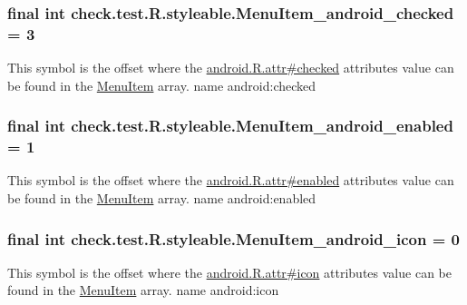 \subsubsection[{Menu\+Item\+\_\+android\+\_\+checked}]{\setlength{\rightskip}{0pt plus 5cm}final int check.\+test.\+R.\+styleable.\+Menu\+Item\+\_\+android\+\_\+checked = 3\hspace{0.3cm}{\ttfamily [static]}}\label{classcheck_1_1test_1_1_r_1_1styleable_a70f7214872e00bf3172089cd9d463d88}
This symbol is the offset where the \hyperlink{}{android.\+R.\+attr\#checked} attribute\textquotesingle{}s value can be found in the \hyperlink{classcheck_1_1test_1_1_r_1_1styleable_af26376072eab01d1b4197e48992dc936}{Menu\+Item} array.  name android\+:checked \hypertarget{classcheck_1_1test_1_1_r_1_1styleable_a51ca1e5adfffb26576e59bc1610f9c6e}{}
\subsubsection[{Menu\+Item\+\_\+android\+\_\+enabled}]{\setlength{\rightskip}{0pt plus 5cm}final int check.\+test.\+R.\+styleable.\+Menu\+Item\+\_\+android\+\_\+enabled = 1\hspace{0.3cm}{\ttfamily [static]}}\label{classcheck_1_1test_1_1_r_1_1styleable_a51ca1e5adfffb26576e59bc1610f9c6e}
This symbol is the offset where the \hyperlink{}{android.\+R.\+attr\#enabled} attribute\textquotesingle{}s value can be found in the \hyperlink{classcheck_1_1test_1_1_r_1_1styleable_af26376072eab01d1b4197e48992dc936}{Menu\+Item} array.  name android\+:enabled \hypertarget{classcheck_1_1test_1_1_r_1_1styleable_aa78bee5f32455dafa0a089ab87130bc1}{}
\subsubsection[{Menu\+Item\+\_\+android\+\_\+icon}]{\setlength{\rightskip}{0pt plus 5cm}final int check.\+test.\+R.\+styleable.\+Menu\+Item\+\_\+android\+\_\+icon = 0\hspace{0.3cm}{\ttfamily [static]}}\label{classcheck_1_1test_1_1_r_1_1styleable_aa78bee5f32455dafa0a089ab87130bc1}
This symbol is the offset where the \hyperlink{}{android.\+R.\+attr\#icon} attribute\textquotesingle{}s value can be found in the \hyperlink{classcheck_1_1test_1_1_r_1_1styleable_af26376072eab01d1b4197e48992dc936}{Menu\+Item} array.  name android\+:icon \hypertarget{classcheck_1_1test_1_1_r_1_1styleable_a59b9e4a6fb4718026e0941ce96cbb5b6}{}
